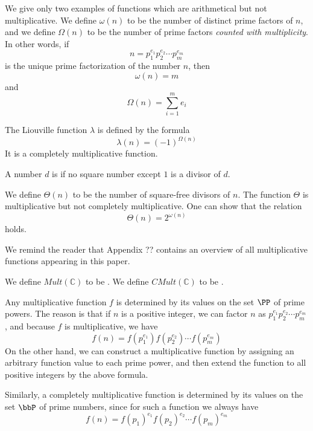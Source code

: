 \documentclass[a4paper]{article}
\begin{document}
\begin{definition}
We give only two examples of functions which are arithmetical but not multiplicative. We define $\omega(n)$ to be the number of distinct prime factors of $n$, and we define $\Omega(n)$ to be the number of prime factors \emph{counted with multiplicity}. In other words, if
$$ n = p_1 ^{e_1} p_2^{e_2} \cdots p_m^{e_m}  $$
is the unique prime factorization of the number $n$, then
$$ \omega(n) = m    $$
and
$$  \Omega(n) = \sum_{i=1}^m  e_i $$
\end{definition}

\begin{example}
The Liouville function $\lambda$ is defined by the formula
$$ \lambda(n) = (-1)^{\Omega(n)}  $$
It is a completely multiplicative function.
\end{example}

\begin{definition}
A number $d$ is  if no square number except $1$ is a divisor of $d$.
\end{definition}

\begin{example}
We define $\Theta(n)$ to be the number of square-free divisors of $n$. The function $\Theta$ is multiplicative but not completely multiplicative. One can show that the relation
$$ \Theta(n) = 2^{\omega(n)}   $$
holds.
\end{example}

We remind the reader that Appendix ?? contains an overview of all multiplicative functions appearing in this paper.

\begin{definition}
We define $Mult(\mathbb{C})$ to be . We define $CMult(\mathbb{C})$ to be .
\end{definition}


Any multiplicative function $f$ is determined by its values on the set $\PP$ of prime powers. The reason is that if $n$ is a positive integer, we can factor $n$ as $p_1^{e_1} p_2^{e_2} \cdots p_m^{e_m}$, and because $f$ is multiplicative, we have
$$ f(n) = f(p_1^{e_1}) f( p_2^{e_2}) \cdots f(p_m^{e_m})   $$
On the other hand, we can construct a multiplicative function by assigning an arbitrary function value to each prime power, and then extend the function to all positive integers by the above formula. 

Similarly, a completely multiplicative function is determined by its values on the set $\bbP$ of prime numbers, since for such a function we always have
$$  f(n) = f(p_1)^{e_1} f( p_2)^{e_2} \cdots f(p_m)^{e_m}  $$
\end{document}
